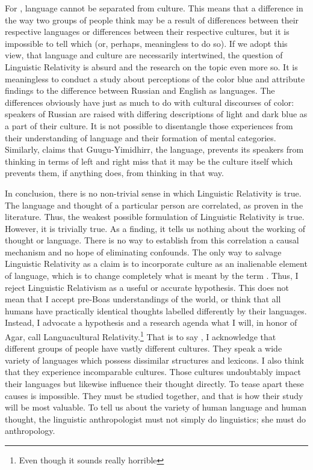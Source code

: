 \documentclass[doc,12pt]{apa6}
\begin{document}
For , language cannot be separated from culture. This means that a 
difference in the way two groups of people think may be a result of differences between 
their respective languages or differences between their respective cultures, but it is 
impossible to tell which (or, perhaps, meaningless to do so). If we adopt this view, 
that language and culture are necessarily intertwined, the question of Linguistic 
Relativity is absurd and the research on the topic even more so. It is meaningless to 
conduct a study about perceptions of the color blue and attribute findings to the 
difference between Russian and English as languages. The differences obviously have just 
as much to do with cultural discourses of color: speakers of Russian are raised with 
differing descriptions of light and dark blue as a part of their culture. It is not 
possible to disentangle those experiences from their understanding of language and their 
formation of mental categories. Similarly, claims that Guugu-Yimidhirr, the language, 
prevents its speakers from thinking in terms of left and right miss that it may be the 
culture itself which prevents them, if anything does, from thinking in that way.

In conclusion, there is no non-trivial sense in which Linguistic Relativity is true. The 
language and thought of a particular person are correlated, as proven in the literature. 
Thus, the weakest possible formulation of Linguistic Relativity is true. However, it is 
trivially true. As a finding, it tells us nothing about the working of thought or 
language. There is no way to establish from this correlation a causal mechanism and no 
hope of eliminating confounds. 
The only way to salvage Linguistic Relativity as a claim is to incorporate culture as an 
inalienable element of language, which is to change completely what is meant by the term
. Thus, I reject Linguistic Relativism as a useful or accurate hypothesis. This does not 
mean that I accept pre-Boas understandings of the world, or think that all humans have 
practically identical thoughts labelled differently by their languages. Instead, I 
advocate a hypothesis and a research agenda what I will, in honor of Agar, call 
Languacultural Relativity.\footnote{Even though it sounds really horrible} That is to say
, I acknowledge that different groups of people have vastly different cultures. They 
speak a wide variety of languages which possess dissimilar structures and lexicons. I 
also think that they experience incomparable cultures. Those cultures undoubtably 
impact their languages but likewise influence their thought directly. To tease apart 
these causes is impossible. They must be studied together, and that is how their study 
will be most valuable. To tell us about the variety of human language and human thought, 
the linguistic anthropologist must not simply do linguistics; she must do anthropology.
\end{document}
